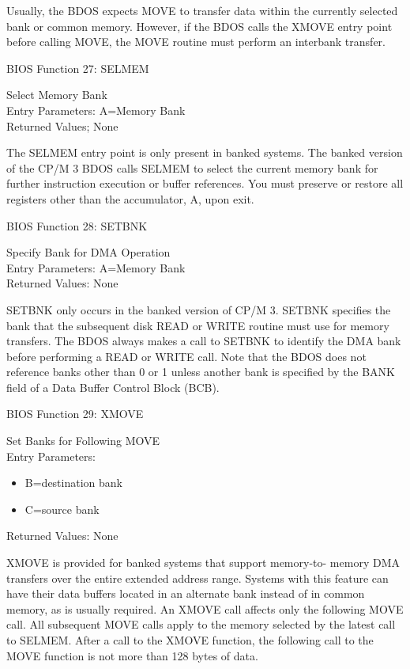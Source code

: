 Usually, the BDOS expects MOVE to transfer data within the currently
selected bank or common memory. However, if the BDOS calls the XMOVE
entry point before calling MOVE, the MOVE routine must perform an
interbank transfer.

BIOS Function 27: SELMEM

Select Memory Bank\\
Entry Parameters: A=Memory Bank\\
Returned Values; None

The SELMEM entry point is only present in banked systems. The banked
version of the CP/M 3 BDOS calls SELMEM to select the current memory
bank for further instruction execution or buffer references. You must
preserve or restore all registers other than the accumulator, A, upon
exit.

BIOS Function 28: SETBNK

Specify Bank for DMA Operation\\
Entry Parameters: A=Memory Bank\\
Returned Values: None

SETBNK only occurs in the banked version of CP/M 3. SETBNK specifies
the bank that the subsequent disk READ or WRITE routine must use for
memory transfers. The BDOS always makes a call to SETBNK to identify
the DMA bank before performing a READ or WRITE call. Note that the
BDOS does not reference banks other than 0 or 1 unless another bank is
specified by the BANK field of a Data Buffer Control Block (BCB).

BIOS Function 29: XMOVE

Set Banks for Following MOVE\\
Entry Parameters:
\begin{itemize}
\item[] B=destination bank
\item[] C=source bank
\end{itemize}
Returned Values: None

XMOVE is provided for banked systems that support memory-to- memory
DMA transfers over the entire extended address range. Systems with
this feature can have their data buffers located in an alternate bank
instead of in common memory, as is usually required. An XMOVE call
affects only the following MOVE call. All subsequent MOVE calls apply
to the memory selected by the latest call to SELMEM. After a call to
the XMOVE function, the following call to the MOVE function is not
more than 128 bytes of data.

